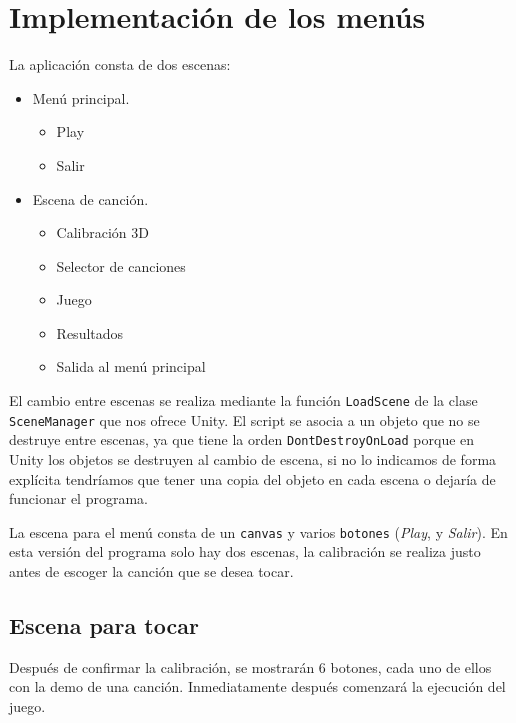 \section{Implementación de los menús}
La aplicación consta de dos escenas:
\begin{itemize}
	\item Menú principal.
	\begin{itemize}
	\item Play
	\item Salir
	\end{itemize}

	\item Escena de canción.
	\begin{itemize}
	\item Calibración 3D
	\item Selector de canciones
	\item Juego
	\item Resultados
	\item Salida al menú principal
	\end{itemize}
\end{itemize}
El cambio entre escenas se realiza mediante la función \texttt{LoadScene} de la
clase \texttt{SceneManager} que nos ofrece Unity.
El script se asocia a un objeto que no se destruye entre escenas, ya que tiene
la orden \texttt{DontDestroyOnLoad} porque en Unity los objetos se destruyen al cambio
de escena, si no lo indicamos de forma explícita tendríamos que tener una copia del objeto
en cada escena o dejaría de funcionar el programa.

La escena para el menú consta de un \texttt{canvas} y varios \texttt{botones} (\textit{Play},
y \textit{Salir}). En esta versión del programa solo hay dos escenas, la calibración se realiza justo antes
de escoger la canción que se desea tocar.

\subsection{Escena para tocar}
Después de confirmar la calibración, se mostrarán 6 botones, cada uno de ellos con la demo de una canción.
Inmediatamente después comenzará la ejecución del juego.

\pagebreak
